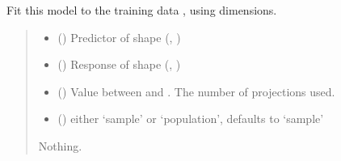 \documentclass[letterpaper,10pt,english]{sphinxmanual}
\begin{document}
\begin{fulllineitems}
\label{\detokenize{NIPALS:NIPALS.nipals.nipals.fit}}
\pysigstartsignatures
{}
\pysigstopsignatures
\sphinxAtStartPar
Fit this model to the training data ,  using  dimensions.
\begin{quote}\begin{description}
\begin{itemize}
\item {} 
\sphinxAtStartPar
{} () \textendash{} Predictor of shape (, )

\item {} 
\sphinxAtStartPar
{} () \textendash{} Response of shape (, )

\item {} 
\sphinxAtStartPar
{} () \textendash{} Value between  and . The number of projections used.

\item {} 
\sphinxAtStartPar
{} () \textendash{} either ‘sample’ or ‘population’, defaults to ‘sample’

\end{itemize}

\sphinxAtStartPar
Nothing.

\end{description}\end{quote}

\end{fulllineitems}

\end{document}
